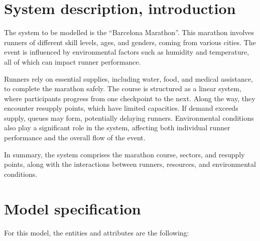 \documentclass[conference]{IEEEtran}
\begin{document}
% 
\section{System description, introduction}
The system to be modelled is the ``Barcelona Marathon''. This marathon involves runners of different skill levels, ages, and genders, coming from various cities. The event is influenced by environmental factors such as humidity and temperature, all of which can impact runner performance. 

Runners rely on essential supplies, including water, food, and medical assistance, to complete the marathon safely. The course is structured as a linear system, where participants progress from one checkpoint to the next. Along the way, they encounter resupply points, which have limited capacities. If demand exceeds supply, queues may form, potentially delaying runners. Environmental conditions also play a significant role in the system, affecting both individual runner performance and the overall flow of the event.

In summary, the system comprises the marathon course, sectors, and resupply points, along with the interactions between runners, resources, and environmental conditions.


\section{Model specification}

For this model, the entities and attributes are the following:
\end{document}
